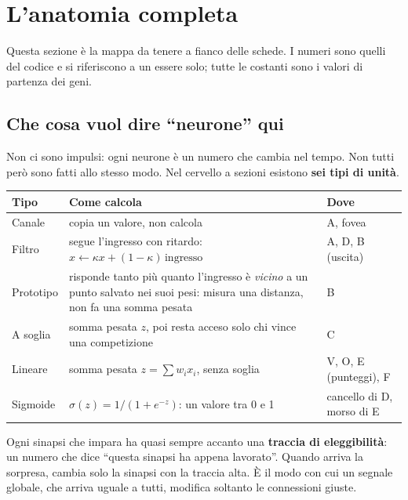 \documentclass[11pt,a4paper]{article}
\begin{document}
\section{L'anatomia completa}\label{sec:anatomia}

Questa sezione è la mappa da tenere a fianco delle schede. I numeri sono quelli del codice e
si riferiscono a un essere solo; tutte le costanti sono i valori di partenza dei geni.

\subsection{Che cosa vuol dire ``neurone'' qui}

Non ci sono impulsi: ogni neurone è un numero che cambia nel tempo. Non tutti però sono
fatti allo stesso modo. Nel cervello a sezioni esistono \textbf{sei tipi di unità}.

\begin{center}
\small
\begin{tabularx}{\textwidth}{@{}L{3.1cm}YL{2.7cm}@{}}
\toprule
\textbf{Tipo} & \textbf{Come calcola} & \textbf{Dove} \\
\midrule
Canale & copia un valore, non calcola & A, fovea \\
Filtro & segue l'ingresso con ritardo: $x\leftarrow\kappa x+(1-\kappa)\,\text{ingresso}$ & A, D, B (uscita) \\
Prototipo & risponde tanto più quanto l'ingresso è \emph{vicino} a un punto salvato nei suoi pesi: misura una distanza, non fa una somma pesata & B \\
A soglia & somma pesata $z$, poi resta acceso solo chi vince una competizione & C \\
Lineare & somma pesata $z=\sum w_i x_i$, senza soglia & V, O, E (punteggi), F \\
Sigmoide & $\sigma(z)=1/(1+e^{-z})$: un valore tra 0 e 1 & cancello di D, morso di E \\
\bottomrule
\end{tabularx}
\end{center}

Ogni sinapsi che impara ha quasi sempre accanto una \textbf{traccia di eleggibilità}: un
numero che dice ``questa sinapsi ha appena lavorato''. Quando arriva la sorpresa, cambia
solo la sinapsi con la traccia alta. È il modo con cui un segnale globale, che arriva
uguale a tutti, modifica soltanto le connessioni giuste.
\end{document}

